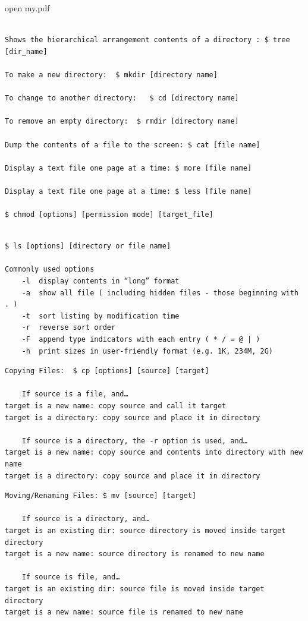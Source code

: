 open my.pdf

\begin{verbatim}

Shows the hierarchical arrangement contents of a directory : $ tree [dir_name]

To make a new directory:  $ mkdir [directory name]

To change to another directory:   $ cd [directory name]

To remove an empty directory:  $ rmdir [directory name]

Dump the contents of a file to the screen: $ cat [file name]

Display a text file one page at a time: $ more [file name]

Display a text file one page at a time: $ less [file name]

$ chmod [options] [permission mode] [target_file]


\end{verbatim}

\begin{verbatim}
$ ls [options] [directory or file name]

Commonly used options
	-l	display contents in “long” format
	-a	show all file ( including hidden files - those beginning with . )
	-t	sort listing by modification time
	-r	reverse sort order
	-F	append type indicators with each entry ( * / = @ | )
	-h	print sizes in user-friendly format (e.g. 1K, 234M, 2G)

\end{verbatim}

\begin{verbatim}
Copying Files:  $ cp [options] [source] [target]

	If source is a file, and…
target is a new name: copy source and call it target
target is a directory: copy source and place it in directory

	If source is a directory, the -r option is used, and…
target is a new name: copy source and contents into directory with new name
target is a directory: copy source and place it in directory
\end{verbatim}


\begin{verbatim}
Moving/Renaming Files: $ mv [source] [target]

	If source is a directory, and…
target is an existing dir: source directory is moved inside target directory
target is a new name: source directory is renamed to new name

	If source is file, and…
target is an existing dir: source file is moved inside target directory
target is a new name: source file is renamed to new name
\end{verbatim}


